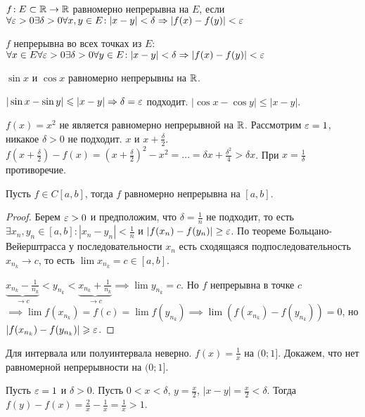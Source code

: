 \begin{definition}
    $f\!: E \subset \mathbb{R} \to \mathbb{R}$ равномерно непрерывна на  $E$, если  $\forall \varepsilon > 0 \exists \delta > 0 \forall x, y \in E\!: |x-y| < \delta \Rightarrow |f(x)-f(y)| < \varepsilon$
\end{definition}
\begin{definition}
    $f$ непрерывна во всех точках из  $E$:\\
    $\forall x \in E \forall \varepsilon > 0 \exists \delta > 0 \forall y \in E\!: |x-y| < \delta \Rightarrow |f(x)-f(y)| < \varepsilon$
\end{definition}
\begin{example}
    $\sin x$ и  $\cos x$ равномерно непрерывны на  $\mathbb{R}$.

     $|\sin x - \sin y| \leqslant |x-y| \Rightarrow \delta = \varepsilon$ подходит. $|\cos x - \cos y| \le |x-y|$.
\end{example}
\begin{example}
    $f(x) = x^2$ не является равномерно непрерывной на $\mathbb{R}$. Рассмотрим  $\varepsilon = 1$, никакое  $\delta > 0$ не подходит.  $x$ и  $x + \frac{\delta}{2}$. $f(x + \frac{\delta}{2}) - f(x)  = (x+\frac{\delta}{2})^2 - x^2 = \ldots = \delta x + \frac{\delta^2}{4} > \delta x$.
    При $x = \frac{1}{\delta}$ противоречие. 
\end{example}
\begin{theorem}
    Пусть $f \in C[a, b]$, тогда $f$ равномерно непрерывна на  $[a, b]$.
\end{theorem}
\begin{proof}
    Берем $\varepsilon > 0$ и предположим, что  $\delta = \frac{1}{n}$ не подходит, то есть $\exists x_n, y_n \in [a, b]\!: |x_n - y_n| < \frac{1}{n}$ и $|f(x_n) - f(y_n)| \geq \varepsilon$. По теореме Больцано-Вейерштрасса у последовательности $x_n$ есть сходящаяся подпоследовательность  $x_{n_k} \to c$, то есть  $\lim x_{n_k} = c \in [a, b]$.

    $\underbrace{x_{n_k} - \frac{1}{n_k}}_{\to c} < y_{n_k} < \underbrace{x_{n_k} + \frac{1}{n_k}}_{\to c} \implies \lim y_{n_k} = c$. Но $f$ непрерывна в точке  $c$  $\implies \lim f(x_{n_k}) = f(c) = \lim f(y_{n_k}) \implies \lim (f(x_{n_k}) - f(y_{n_k})) = 0$, но $|f(x_{n_k}) - f(y_{n_k})| \geqslant \varepsilon$.
\end{proof}
\begin{remark}
    Для интервала или полуинтервала неверно. $f(x) = \frac{1}{x}$ на $(0; 1]$. Докажем, что нет равномерной непрерывности на  $(0; 1]$. 

    Пусть  $\varepsilon = 1$ и  $\delta > 0$. Пусть  $0 < x < \delta$,  $y = \frac{x}{2}$, $|x-y| = \frac{x}{2} < \delta$. Тогда $f(y) - f(x) = \frac{2}{x} - \frac{1}{x} = \frac{1}{x} > 1$.
\end{remark}

